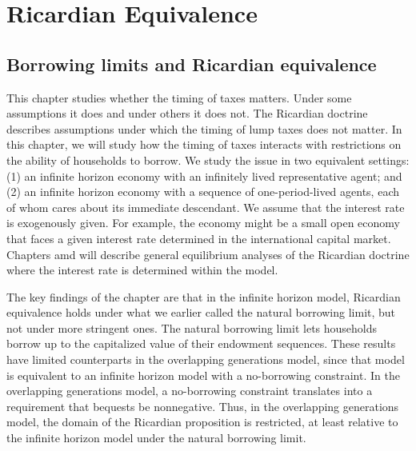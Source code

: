 

%




\hbox{}

\def\toone{{t+1}}
\def\ttwo{{t+2}}
\def\tthree{{t+3}}
\def\Tone{{T+1}}
\def\TTT{{T-1}}
\def\rtr{{\rm tr}}

\chapter{Ricardian Equivalence\label{ricardian}}

\section{Borrowing limits and Ricardian equivalence}

  This chapter studies whether the timing of taxes
matters.  Under some assumptions it does and under others it does
not.  The Ricardian doctrine describes assumptions under
which the timing of lump taxes does not matter.
In this chapter, we will study how the timing of taxes interacts
with restrictions on the ability of households to borrow.  We study
the issue in two equivalent settings:
(1) an infinite horizon economy with an infinitely lived
representative agent; and (2) an infinite horizon economy
with a sequence of one-period-lived agents, each of whom cares
about its immediate descendant. We assume that
the interest rate is exogenously given. For example,
the economy might be a small open economy that faces a given
interest rate determined in the
international capital market. Chapters  amd   will describe
 general equilibrium
analyses of the Ricardian doctrine where the interest
rate is determined within the model.

  The key findings of the chapter are that in the infinite horizon
model, Ricardian equivalence holds under what  we earlier
called the natural borrowing limit, %
but not under more stringent ones.  The natural borrowing limit
 lets households borrow up to the capitalized
value of their endowment sequences.  These results have limited counterparts
in the overlapping generations model, since that model is equivalent
to an infinite horizon model with a  no-borrowing constraint.
  In the overlapping generations model,
a no-borrowing constraint translates into a requirement
that bequests be nonnegative.
Thus, in the overlapping generations  model, the domain
of the Ricardian proposition is restricted, at least relative
to the infinite horizon model under the natural borrowing limit.


